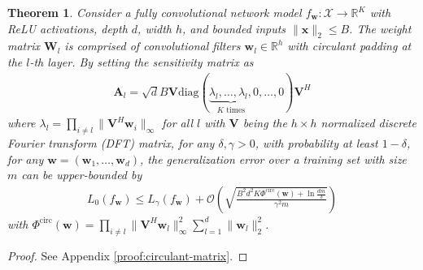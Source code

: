 \documentclass[journal]{IEEEtran} %
\newtheorem{theorem}{Theorem}%
\def\vw{{\bm{w}}}
\def\vx{{\bm{x}}}
\def\mA{{\bm{A}}}
\def\mV{{\bm{V}}}
\def\mW{{\bm{W}}}
\def\gO{{\mathcal{O}}}
\def\gX{{\mathcal{X}}}
\newcommand{\R}{\mathbb{R}}
\newcommand{\Norm}[1]{\|#1\|}
\begin{document}
\begin{theorem} \label{thm:circulant-matrix}
    Consider a fully convolutional network model $f_{\vw}: \gX \to \R^K$ with ReLU activations, depth $d$, width $h$, and bounded inputs $\Norm{\vx}_2 \le B$. The weight matrix $\mW_l$ is comprised of convolutional filters $\vw_l \in \R^h$ with circulant padding at the $l$-th layer. By setting the sensitivity matrix as
    \begin{align}
    \mA_l = \sqrt{d} B \mV \mathrm{diag}(\underbrace{\lambda_l,\dots,\lambda_l,}_{K \text{ times}} 0,\dots,0) \mV^H
\end{align}
where $\lambda_l=\prod_{i\ne l} \Norm{\mV^H \vw_i}_{\infty}$
    for all $l$ with $\mV$ being the $h \times h$ normalized discrete Fourier transform (DFT) matrix, for any $\delta,\gamma>0$, with probability at least $1-\delta$, for any $\vw=(\vw_1,\dots,\vw_d)$, the generalization error over a training set with size $m$ can be upper-bounded by
    \begin{align}
    L_0(f_{\vw}) \le \hat{L}_{\gamma}(f_{\vw}) + \gO \left( \sqrt{ \frac{ B^2d^2K {\Phi}^{\mathrm{circ}}(\vw) + \ln \frac{dm}{\delta}}{\gamma^2m}} \right)
    \end{align}
with ${\Phi}^{\mathrm{circ}}(\vw)=\prod_{i\ne l} \Norm{\mV^H \vw_l}_{\infty}^2 \sum_{l=1}^d \Norm{\vw_l}_2^2$.
\end{theorem}

\begin{proof}
See Appendix \ref{proof:circulant-matrix}.
\end{proof}
\end{document}
